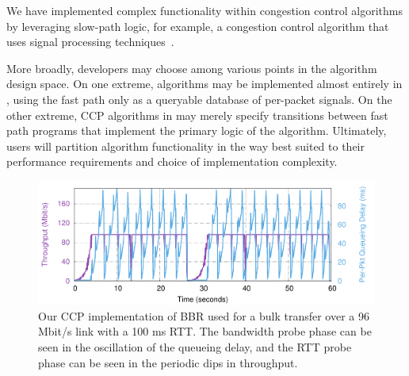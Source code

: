 We have implemented complex functionality within congestion control algorithms
by leveraging slow-path logic, for example, a congestion control
algorithm that uses signal processing techniques~\cite{nimbus}.

More broadly, developers may choose among various points in the algorithm design
space.
On one extreme, algorithms may be implemented almost entirely in \userspace,
using the fast path only as a queryable database of per-packet signals.
On the other extreme, CCP algorithms in \userspace may merely specify
transitions between fast path programs that implement the primary logic of the
algorithm.
Ultimately, users will partition algorithm functionality in the way
best suited to their performance requirements and choice of implementation complexity.

\begin{figure}[t]
\centering
    \includegraphics[width=\columnwidth]{img/bbr}
    \caption{
    Our CCP implementation of BBR used for a bulk transfer over a 96 Mbit/s link with a 100 ms RTT. The bandwidth probe phase can be seen in the oscillation of the queueing delay, and the RTT probe phase can be seen in the periodic dips in throughput.
    }\label{fig:ccp:bbr}
\end{figure}
